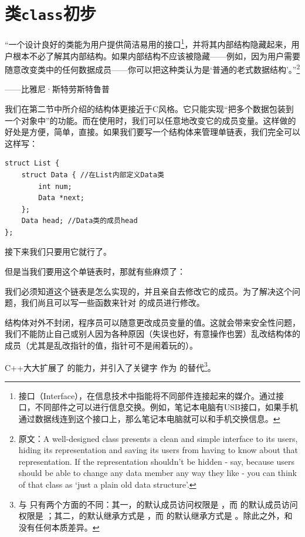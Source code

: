 \section{类\texttt{class}初步}
{\large ``一个设计良好的类能为用户提供简洁易用的接口\footnote{接口（Interface），在信息技术中指能将不同部件连接起来的媒介。通过接口，不同部件之可以进行信息交换。例如，笔记本电脑有USB接口，如果手机通过数据线连到这个接口上，那么笔记本电脑就可以和手机交换信息。}，并将其内部结构隐藏起来，用户根本不必了解其内部结构。如果内部结构不应该被隐藏——例如，因为用户需要随意改变类中的任何数据成员——你可以把这种类认为是`普通的老式数据结构'。''\footnote{原文：A well-designed class presents a clean and simple interface to its users, hiding its representation and saving its users from having to know about that representation. If the representation shouldn't be hidden - say, because users should be able to change any data member any way they like - you can think of that class as `just a plain old data structure'.}}
\begin{flushright}——比雅尼·斯特劳斯特鲁普\end{flushright}\par
我们在第二节中所介绍的结构体更接近于C风格。它只能实现``把多个数据包装到一个对象中''的功能。而在使用时，我们可以任意地改变它的成员变量。这样做的好处是方便，简单，直接。如果我们要写一个结构体来管理单链表，我们完全可以这样写：
\begin{lstlisting}
struct List {
    struct Data { //在List内部定义Data类
        int num;
        Data *next;
    };
    Data head; //Data类的成员head
};
\end{lstlisting}
接下来我们只要用它就行了。\par
但是当我们要用这个单链表时，那就有些麻烦了：\par
我们必须知道这个链表是怎么实现的，并且亲自去修改它的成员。为了解决这个问题，我们尚且可以写一些函数来针对 \lstinline@struct@ 的成员进行修改。\par
结构体对外不封闭，程序员可以随意更改成员变量的值。这就会带来安全性问题，我们不能防止自己或别人因为各种原因（失误也好，有意操作也罢）乱改结构体的成员（尤其是乱改指针的值，指针可不是闹着玩的）。\par
C++大大扩展了 \lstinline@struct@ 的能力，并引入了关键字 \lstinline@class@ 作为 \lstinline@struct@ 的替代\footnote{\lstinline@class@ 与 \lstinline@struct@ 只有两个方面的不同：其一，\lstinline@class@ 的默认成员访问权限是 \lstinline@private@，而 \lstinline@struct@ 的默认成员访问权限是 \lstinline@public@；其二，\lstinline@class@ 的默认继承方式是 \lstinline@private@，而 \lstinline@struct@ 的默认继承方式是 \lstinline@public@。除此之外，\lstinline@class@ 和 \lstinline@struct@ 没有任何本质差异。}。\par
